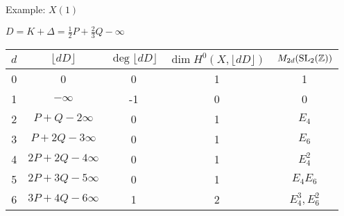 \begin{frame}{Example: $X(1)$}


  \begin{center}
    $D = K + \Delta = \frac{1}{2}P + \frac{2}{3}Q -\infty$
  \end{center}


\begin{center}
\begin{tabular}{ |c| c| c| c|c|}
\hline
$d$ & $\lfloor dD \rfloor$ & $\deg \lfloor dD \rfloor$ &  $\dim H^0(X,\lfloor dD \rfloor)$  & $M_{2d}(\operatorname{SL}_2(\mathbb{Z}))$  \\ 
\hline
0& 0& 0&  1& 1 \\ 
1&$-\infty$&-1& 0&  0 \\  
2&$P + Q -2\infty$&0& 1&  $E_4$  \\
3&$P + 2Q -3\infty$&0& 1&  $E_6$  \\
4&$2P + 2Q -4\infty$&0& 1&  $E_4^2$  \\
5&$2P + 3Q -5\infty$&0& 1&  $E_4E_6$  \\
6&$3P + 4Q -6\infty$&1& 2& $E_4^3, E_6^2$   \\
\hline
\end{tabular}
\end{center}


\end{frame}
